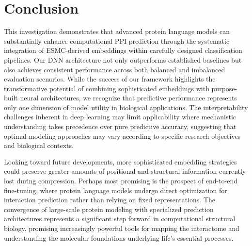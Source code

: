 \documentclass{article}
\begin{document}
	\section{Conclusion}

	This investigation demonstrates that advanced protein language models can substantially enhance computational PPI prediction through the systematic integration of ESMC-derived embeddings within carefully designed classification pipelines. Our DNN architecture not only outperforms established baselines but also achieves consistent performance across both balanced and imbalanced evaluation scenarios. While the success of our framework highlights the transformative potential of combining sophisticated embeddings with purpose-built neural architectures, we recognize that predictive performance represents only one dimension of model utility in biological applications. The interpretability challenges inherent in deep learning may limit applicability where mechanistic understanding takes precedence over pure predictive accuracy, suggesting that optimal modeling approaches may vary according to specific research objectives and biological contexts.

	Looking toward future developments, more sophisticated embedding strategies could preserve greater amounts of positional and structural information currently lost during compression. Perhaps most promising is the prospect of end-to-end fine-tuning, where protein language models undergo direct optimization for interaction prediction rather than relying on fixed representations. The convergence of large-scale protein modeling with specialized prediction architectures represents a significant step forward in computational structural biology, promising increasingly powerful tools for mapping the interactome and understanding the molecular foundations underlying life's essential processes.

	
	
	
	
	
\end{document}
